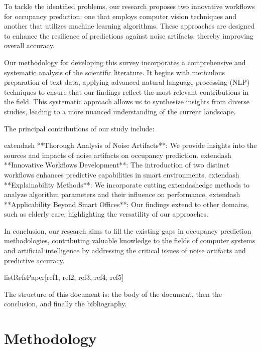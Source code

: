 \documentclass[runningheads]{llncs}
\begin{document}
To tackle the identified problems, our research proposes two innovative workflows for occupancy prediction: one that employs computer vision techniques and another that utilizes machine learning algorithms. These approaches are designed to enhance the resilience of predictions against noise artifacts, thereby improving overall accuracy.

Our methodology for developing this survey incorporates a comprehensive and systematic analysis of the scientific literature. It begins with meticulous preparation of text data, applying advanced natural language processing (NLP) techniques to ensure that our findings reflect the most relevant contributions in the field. This systematic approach allows us to synthesize insights from diverse studies, leading to a more nuanced understanding of the current landscape.

The principal contributions of our study include:

	extendash{} **Thorough Analysis of Noise Artifacts**: We provide insights into the sources and impacts of noise artifacts on occupancy prediction.
	extendash{} **Innovative Workflows Development**: The introduction of two distinct workflows enhances predictive capabilities in smart environments.
	extendash{} **Explainability Methods**: We incorporate cutting	extendash{}edge methods to analyze algorithm parameters and their influence on performance.
	extendash{} **Applicability Beyond Smart Offices**: Our findings extend to other domains, such as elderly care, highlighting the versatility of our approaches.

In conclusion, our research aims to fill the existing gaps in occupancy prediction methodologies, contributing valuable knowledge to the fields of computer systems and artificial intelligence by addressing the critical issues of noise artifacts and predictive accuracy.

\begin{thebibliography}{99}
\item listRefsPaper[ref1, ref2, ref3, ref4, ref5]
\end{thebibliography}
 The structure of this document is: the body of the document, then the conclusion, and finally the bibliography.
\section{Methodology}
\end{document}
